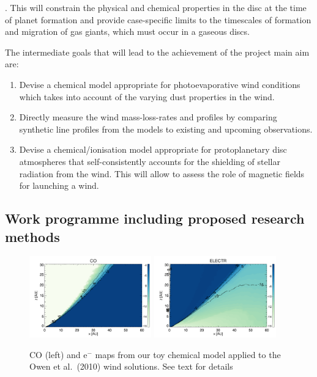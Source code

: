 \documentclass[10pt,fleqn,twoside]{article}
\begin{document}
. This will constrain the physical and chemical properties in the disc at the time of planet formation and provide case-specific limits to the timescales of formation and migration of gas giants, which must occur in a gaseous discs. 

The intermediate goals that will lead to the achievement of the project main aim are: 

\begin{enumerate}

\item Devise a chemical model appropriate for photoevaporative wind conditions which takes into account of the varying dust properties in the wind. 
\item Directly measure the wind mass-loss-rates and profiles by
  comparing synthetic line profiles from the models to existing and upcoming observations.
\item Devise a chemical/ionisation model appropriate for
  protoplanetary disc atmospheres that self-consistently accounts for
  the shielding of stellar radiation from the wind. This will allow to
  assess the role of magnetic fields for launching a wind.
\end{enumerate}

\subsection{Work programme including proposed research methods}

 \begin{figure}
   \centering
   \includegraphics[width=0.47\textwidth]{Lx_2e29_CO.pdf}
   \includegraphics[width=0.47\textwidth]{Lx_2e29_ELECTR.pdf}
   \caption{CO (left) and e$^-$ maps from our toy chemical model
     applied to the Owen et al.\ (2010) wind solutions. See text for details
}
              \label{fig:chem}%
    \end{figure}
\end{document}
